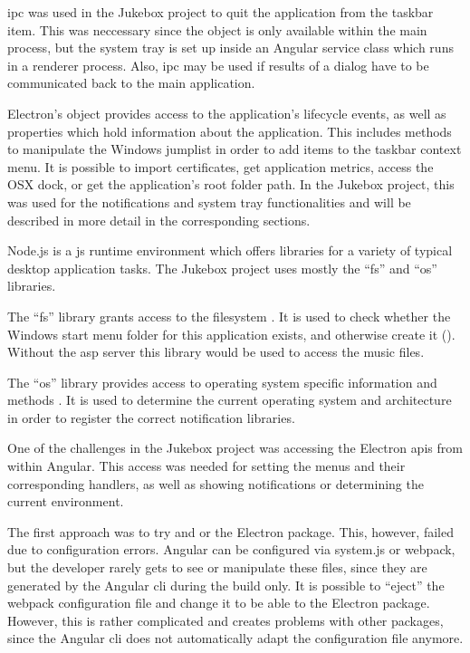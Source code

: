 \gls{ipc} was used in the Jukebox project to quit the application from the taskbar item. This was neccessary since the  object is only available within the main process, but the system tray is set up inside an Angular service class which runs in a renderer process. Also, \gls{ipc} may be used if results of a dialog have to be communicated back to the main application.


Electron's  object provides access to the application's lifecycle events, as well as properties which hold information about the application. This includes methods to manipulate the Windows jumplist in order to add items to the taskbar context menu. It is possible to import certificates, get application metrics, access the OSX dock, or get the application's root folder path. In the Jukebox project, this was used for the notifications and system tray functionalities and will be described in more detail in the corresponding sections.


Node.js is a \gls{js} runtime environment which offers libraries for a variety of typical desktop application tasks. The Jukebox project uses mostly the \enquote{fs} and \enquote{os} libraries.

The \enquote{fs} library grants access to the filesystem \cite{nodejsFS}. It is used to check whether the Windows start menu folder for this application exists, and otherwise create it (). Without the \gls{asp} server this library would  be used to access the music files.

The \enquote{os} library provides access to operating system specific information and methods \cite{nodejsOS}. It is used to determine the current operating system and architecture in order to register the correct notification libraries.


One of the challenges in the Jukebox project was accessing the Electron \gls{api}s from within Angular. This access was needed for setting the menus and their corresponding  handlers, as well as showing notifications or determining the current environment.


The first approach was to try and  or  the Electron package. This, however, failed due to configuration errors. Angular can be configured via system.js or webpack, but the developer rarely gets to see or manipulate these files, since they are generated by the Angular \gls{cli} during the build only. It is possible to \enquote{eject} the webpack configuration file and change it to be able to  the Electron package. However, this is rather complicated and creates problems with other packages, since the Angular \gls{cli} does not automatically adapt the configuration file anymore. \cite{electronRequireError}

